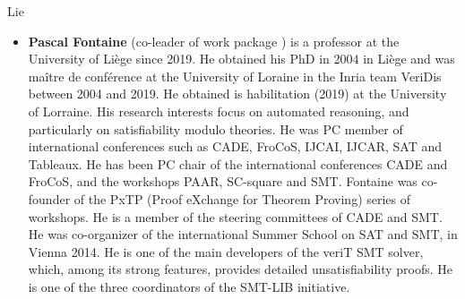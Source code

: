 \begin{sitedescription}{Lie}
\begin{itemize}
\item{\bf Pascal Fontaine} (co-leader of work package ) is a
  professor at the University of Liège since 2019.  He obtained his PhD in 2004
  in Liège and was maître de conférence at the University of Loraine in the
  Inria team VeriDis between 2004 and 2019.  He obtained is habilitation (2019)
  at the University of Lorraine.  His research interests focus on automated
  reasoning, and particularly on satisfiability modulo theories.  He was PC
  member of international conferences such as CADE, FroCoS, IJCAI, IJCAR, SAT
  and Tableaux.  He has been PC chair of the international conferences CADE and
  FroCoS, and the workshops PAAR, SC-square and SMT.  Fontaine was co-founder of
  the PxTP (Proof eXchange for Theorem Proving) series of workshops.  He is a
  member of the steering committees of CADE and SMT.  He was co-organizer of the
  international Summer School on SAT and SMT, in Vienna 2014.  He is one of the
  main developers of the veriT SMT solver, which, among its strong features,
  provides detailed unsatisfiability proofs.  He is one of the three
  coordinators of the SMT-LIB initiative.
\end{itemize}

\end{sitedescription}

